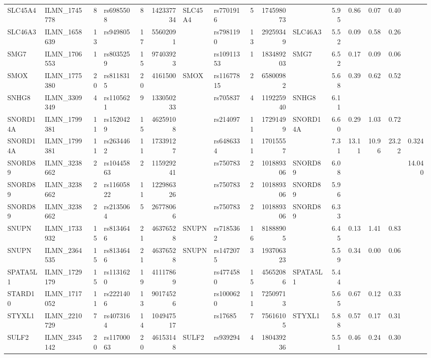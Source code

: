 \documentclass{article}
\begin{document}
\begin{landscape}
{\begin{ThreePartTable}
\begin{longtable}{|llr|lrrl|lrrl|rrrr|r|}
  SLC45A4 & ILMN\_1745778 & 8 & rs6985508 & 8 & 142337734 & SLC45A4 & rs7701916 & 5 & 174598073 &  & 5.95 & 0.86 & 0.07 & 0.40 &  \\
  SLC46A3 & ILMN\_1658639 & 13 & rs949805 & 17 & 55602091 &  & rs7981190 & 13 & 29259349 & SLC46A3 & 5.52 & 0.09 & 0.58 & 0.26 &  \\
  SMG7 & ILMN\_1706553 & 1 & rs8035259 & 15 & 97403923 &  & rs10911353 & 1 & 183489203 & SMG7 & 6.52 & 0.17 & 0.09 & 0.06 &  \\
  SMOX & ILMN\_1775380 & 20 & rs8118315 & 20 & 4161500 & SMOX & rs11677815 & 2 & 65800982 &  & 5.68 & 0.39 & 0.62 & 0.52 &  \\
  SNHG8 & ILMN\_3309349 & 4 & rs1105621 & 9 & 133050233 &  & rs705837 & 4 & 119225940 & SNHG8 & 6.11 &  &  &  &  \\
  SNORD14A & ILMN\_1799381 & 11 & rs1520429 & 15 & 46259108 &  & rs214097 & 11 & 17291499 & SNORD14A & 6.60 & 0.29 & 1.03 & 0.72 &  \\
  SNORD14A & ILMN\_1799381 & 11 & rs2634462 & 11 & 17339127 &  & rs6486334 & 11 & 17015557 &  & 7.31 & 13.11 & 10.96 & 23.22 & 0.324 \\
  SNORD89 & ILMN\_3238662 & 2 & rs10445863 & 2 & 115929241 &  & rs750783 & 2 & 101889306 & SNORD89 & 6.08 &  &  &  & 14.040 \\
  SNORD89 & ILMN\_3238662 & 2 & rs11605822 & 11 & 122986326 &  & rs750783 & 2 & 101889306 & SNORD89 & 5.96 &  &  &  &  \\
  SNORD89 & ILMN\_3238662 & 2 & rs2135064 & 5 & 26778066 &  & rs750783 & 2 & 101889306 & SNORD89 & 6.33 &  &  &  &  \\
  SNUPN & ILMN\_1733932 & 15 & rs8134646 & 21 & 46376528 & SNUPN & rs7185362 & 16 & 81888905 &  & 6.45 & 0.13 & 1.41 & 0.83 &  \\
  SNUPN & ILMN\_2364535 & 15 & rs8134646 & 21 & 46376528 & SNUPN & rs1472075 & 3 & 193706323 &  & 5.59 & 0.34 & 0.00 & 0.06 &  \\
  SPATA5L1 & ILMN\_1729179 & 15 & rs1131620 & 19 & 41117869 &  & rs4774580 & 15 & 45652086 & SPATA5L1 & 5.44 &  &  &  &  \\
  STARD10 & ILMN\_1717052 & 11 & rs2221406 & 13 & 90174526 &  & rs1000620 & 11 & 72509713 &  & 5.65 & 0.67 & 0.12 & 0.33 &  \\
  STYXL1 & ILMN\_2210729 & 7 & rs4073164 & 14 & 104947517 &  & rs17685 & 7 & 75616105 & STYXL1 & 5.88 & 0.57 & 0.17 & 0.31 &  \\
  SULF2 & ILMN\_2345142 & 20 & rs11700063 & 20 & 46153148 & SULF2 & rs939294 & 4 & 180439236 &  & 5.51 & 0.46 & 0.24 & 0.30 &  \\

\end{longtable}
\end{ThreePartTable}}
\end{landscape}
\end{document}

